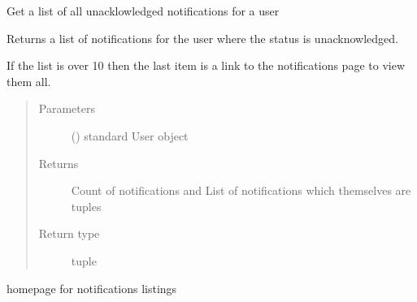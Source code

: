 \documentclass[letterpaper,10pt,english]{sphinxmanual}
\begin{document}
\begin{fulllineitems}
\label{\detokenize{notifications:notifications.views.get_notifications_for_user}}
Get a list of all unacklowledged notifications for a user

Returns a list of notifications for the user where the status is
unacknowledged.

If the list is over 10 then the last item is a link to the notifications
page to view them all.
\begin{quote}\begin{description}
\item[{Parameters}] \leavevmode
{} ({\hyperref[\detokenize{accounts:accounts.models.User}]{}}) \textendash{} standard User object

\item[{Returns}] \leavevmode
Count of notifications and List of notifications which themselves are tuples

\item[{Return type}] \leavevmode
tuple

\end{description}\end{quote}

\end{fulllineitems}


\begin{fulllineitems}
\label{\detokenize{notifications:notifications.views.homepage}}
homepage for notifications listings

\end{fulllineitems}

\end{document}

